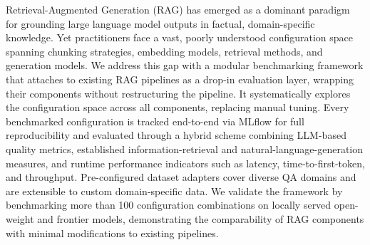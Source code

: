 Retrieval-Augmented Generation (RAG) has emerged as a dominant paradigm for grounding large language model outputs in factual, domain-specific knowledge. 
Yet practitioners face a vast, poorly understood configuration space spanning chunking strategies, embedding models, retrieval methods, and generation models. 
We address this gap with a modular benchmarking framework that attaches to existing RAG pipelines as a drop-in evaluation layer, wrapping their components without restructuring the
pipeline. It systematically explores the configuration space across all components, replacing manual tuning. 
Every benchmarked configuration is tracked end-to-end via MLflow for full reproducibility and evaluated through a hybrid scheme combining LLM-based quality metrics, established information-retrieval and natural-language-generation measures, and runtime performance indicators such as latency, time-to-first-token, and throughput. 
Pre-configured dataset adapters cover diverse QA domains and are extensible to custom domain-specific data. 
We validate the framework by benchmarking more than 100 configuration combinations on locally served open-weight and frontier models, demonstrating the comparability of RAG components with minimal modifications to existing pipelines.


